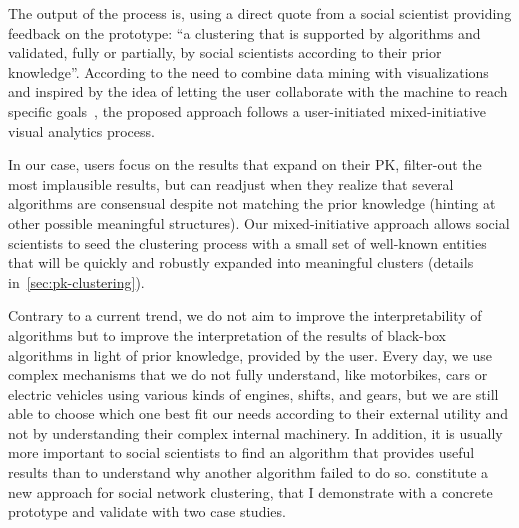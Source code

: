 The output of the process is, using a direct quote from a social scientist providing feedback on the prototype: ``a clustering that is supported by algorithms and validated, fully or partially, by social scientists according to their prior knowledge''.
According to the need to combine data mining with visualizations~\cite{shneidermanInventingDiscoveryTools2002} and inspired by the idea of letting the user collaborate with the machine to reach specific goals~\cite{horvitzPrinciplesMixedinitiativeUser1999}, the proposed approach follows a user-initiated mixed-initiative~\cite{horvitzPrinciplesMixedinitiativeUser1999} visual analytics process.

In our case, users focus on the results that expand on their PK, filter-out the most implausible results, but can readjust  when they realize that several algorithms are consensual despite not matching the prior knowledge (hinting at other possible meaningful structures). Our mixed-initiative approach allows social scientists to seed the clustering process with a small set of well-known entities that will be quickly and robustly expanded into meaningful clusters (details in~\autoref{sec:pk-clustering}).

Contrary to a current trend\cite{molnar2019}, we do not aim to improve the interpretability of algorithms but to improve the interpretation of the results of black-box algorithms in light of prior knowledge, provided by the user. Every day, we use complex mechanisms that we do not fully understand, like motorbikes, cars or electric vehicles using various kinds of engines, shifts, and gears, but we are still able to choose which one best fit our needs according to their external utility and not by understanding their complex internal machinery. In addition, it is usually more important to social scientists to find an algorithm that provides useful results than to understand why another algorithm failed to do so.
\pkclustering constitute a new approach for social network clustering, that I demonstrate with a concrete prototype and validate with two case studies.


